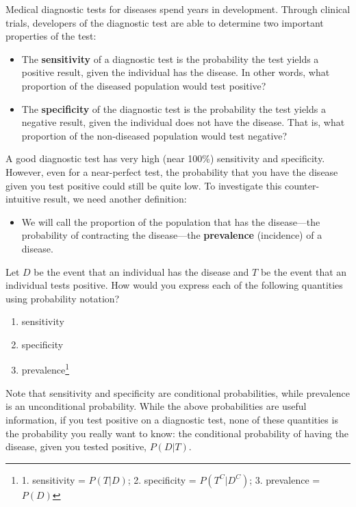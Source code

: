 \documentclass[
  10pt,
  openany]{book}
\providecommand{\tightlist}{%
  \setlength{\itemsep}{0pt}\setlength{\parskip}{0pt}}
\theoremstyle{definition}
\theoremstyle{definition}
\theoremstyle{definition}
\theoremstyle{definition}
\theoremstyle{remark}
\begin{document}
Medical diagnostic tests for diseases spend years in development. Through clinical trials, developers of the diagnostic test are able to determine two important properties of the test:

\begin{itemize}
\tightlist
\item
  The \textbf{sensitivity} of a diagnostic test is the probability the test yields a positive result, given the individual has the disease. In other words, what proportion of the diseased population would test positive?
\item
  The \textbf{specificity} of the diagnostic test is the probability the test yields a negative result, given the individual does not have the disease. That is, what proportion of the non-diseased population would test negative?
\end{itemize}

A good diagnostic test has very high (near 100\%) sensitivity and specificity. However, even for a near-perfect test, the probability that you have the disease given you test positive could still be quite low. To investigate this counter-intuitive result, we need another definition:

\begin{itemize}
\tightlist
\item
  We will call the proportion of the population that has the disease---the probability of contracting the disease---the \textbf{prevalence} (incidence) of a disease.
\end{itemize}

Let \(D\) be the event that an individual has the disease and \(T\) be the event that an individual tests positive. How would you express each of the following quantities using probability notation?

\begin{enumerate}
\def\labelenumi{\arabic{enumi}.}
\tightlist
\item
  sensitivity
\item
  specificity
\item
  prevalence\footnote{1. sensitivity = \(P(T | D)\); 2. specificity = \(P(T^C | D^C)\); 3. prevalence = \(P(D)\)}
\end{enumerate}

Note that sensitivity and specificity are conditional probabilities, while prevalence is an unconditional probability. While the above probabilities are useful information, if you test positive on a diagnostic test, none of these quantities is the probability you really want to know: the conditional probability of having the disease, given you tested positive, \(P(D | T)\).
\end{document}
